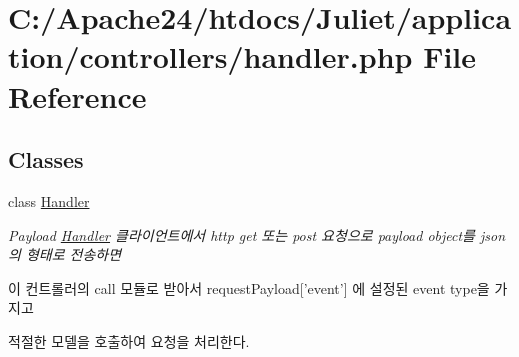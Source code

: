 \hypertarget{handler_8php}{\section{C\-:/\-Apache24/htdocs/\-Juliet/application/controllers/handler.php File Reference}
\label{handler_8php}
}
\subsection*{Classes}
\begin{DoxyCompactItemize}
\item 
class \hyperlink{class_handler}{Handler}
\begin{DoxyCompactList}\small\item\em Payload \hyperlink{class_handler}{Handler} 클라이언트에서 http get 또는 post 요청으로 payload object를 json의 형태로 전송하면\par
 이 컨트롤러의 call 모듈로 받아서 request\-Payload\mbox{[}'event'\mbox{]} 에 설정된 event type을 가지고\par
 적절한 모델을 호출하여 요청을 처리한다. \end{DoxyCompactList}\end{DoxyCompactItemize}

